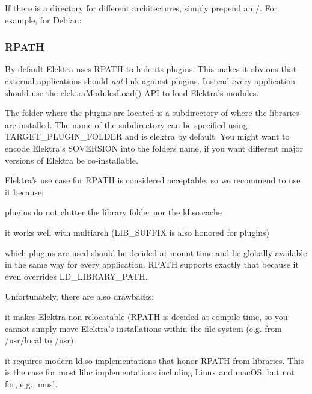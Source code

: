 If there is a directory for different architectures, simply prepend an {\ttfamily /}. For example, for Debian\+: 


\subsubsection*{R\+P\+A\+TH}

By default Elektra uses {\ttfamily R\+P\+A\+TH} to hide its plugins. This makes it obvious that external applications should {\itshape not} link against plugins. Instead every application should use the {\ttfamily elektra\+Modules\+Load()} A\+PI to load Elektra’s modules.

The folder where the plugins are located is a subdirectory of where the libraries are installed. The name of the subdirectory can be specified using {\ttfamily T\+A\+R\+G\+E\+T\+\_\+\+P\+L\+U\+G\+I\+N\+\_\+\+F\+O\+L\+D\+ER} and is {\ttfamily elektra} by default. You might want to encode Elektra’s {\ttfamily S\+O\+V\+E\+R\+S\+I\+ON} into the folders name, if you want different major versions of Elektra be co-\/installable.

Elektra’s use case for {\ttfamily R\+P\+A\+TH} is considered acceptable, so we recommend to use it because\+:


\begin{DoxyItemize}
\item plugins do not clutter the library folder nor the {\ttfamily ld.\+so.\+cache}
\item it works well with multiarch ({\ttfamily L\+I\+B\+\_\+\+S\+U\+F\+F\+IX} is also honored for plugins)
\item which plugins are used should be decided at mount-\/time and be globally available in the same way for every application. {\ttfamily R\+P\+A\+TH} supports exactly that because it even overrides {\ttfamily L\+D\+\_\+\+L\+I\+B\+R\+A\+R\+Y\+\_\+\+P\+A\+TH}.
\end{DoxyItemize}

Unfortunately, there are also drawbacks\+:


\begin{DoxyItemize}
\item it makes Elektra non-\/relocatable ({\ttfamily R\+P\+A\+TH} is decided at compile-\/time, so you cannot simply move Elektra’s installations within the file system (e.\+g. from {\ttfamily /usr/local} to {\ttfamily /usr})
\item it requires modern {\ttfamily ld.\+so} implementations that honor {\ttfamily R\+P\+A\+TH} from libraries. This is the case for most {\ttfamily libc} implementations including Linux and mac\+OS, but not for, e.\+g., {\ttfamily musl}.
\end{DoxyItemize}

